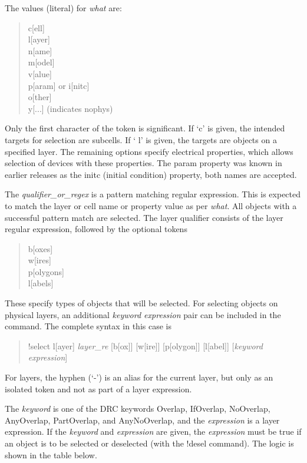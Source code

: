 The values (literal) for {\it what} are:
\begin{quote}\rr
{\vt c}[ell]\\
{\vt l}[ayer]\\
{\vt n}[ame]\\
{\vt m}[odel]\\
{\vt v}[alue]\\
{\vt p}[aram] or {\vt i}[nitc]\\
{\vt o}[ther]\\
{\vt y}[...] (indicates {\et nophys})
\end{quote}
Only the first character of the token is significant.  If `{\vt c}'
is given, the intended targets for selection are subcells.  If `{\vt
l}' is given, the targets are objects on a specified layer.  The
remaining options specify electrical properties, which allows
selection of devices with these properties.  The {\vt param} property
was known in earlier releases as the {\vt initc} (initial condition)
property, both names are accepted.

The {\it qualifier\_or\_regex\/} is a pattern matching regular
expression.  This is expected to match the layer or cell name or
property value as per {\it what}.  All objects with a successful
pattern match are selected.  The layer qualifier consists of the layer
regular expression, followed by the optional tokens
\begin{quote}\rr
{\vt b}[oxes]\\
{\vt w}[ires]\\
{\vt p}[olygons]\\
{\vt l}[abels]\\
\end{quote}
These specify types of objects that will be selected.  For selecting
objects on physical layers, an additional {\it keyword expression}
pair can be included in the command.  The complete syntax in this case
is
\begin{quote}
    {\vt !select l[ayer] {\it layer\_re} [b[ox]] [w[ire]] [p[olygon]]
      [l[abel]] [{\it keyword expression\/}]}
\end{quote}
    
For layers, the hyphen (`{\vt -}') is an alias for the current layer,
but only as an isolated token and not as part of a layer expression.

The {\it keyword} is one of the DRC keywords {\et Overlap}, {\et
IfOverlap}, {\et NoOverlap}, {\et AnyOverlap}, {\et PartOverlap}, and
{\et AnyNoOverlap}, and the {\it expression} is a layer expression. 
If the {\it keyword} and {\it expression} are given, the {\it
expression} must be true if an object is to be selected or deselected
(with the {\cb !desel} command).  The logic is shown in the table
below.

